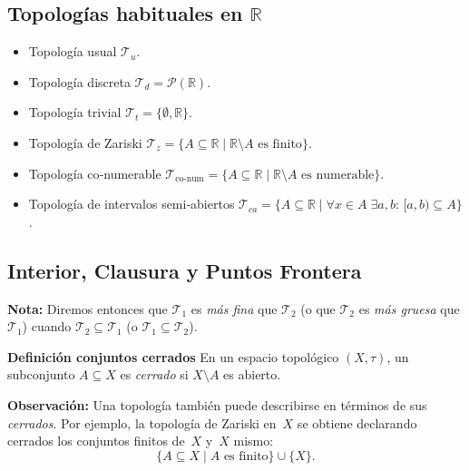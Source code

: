 \subsection{Topologías habituales en $\mathbb{R}$}
\begin{itemize}
  \item Topología usual\; $\mathcal T_{u}$.
  \item Topología discreta\;
        $\displaystyle \mathcal T_{d}=\mathcal{P}(\mathbb{R})$.
  \item Topología trivial\;
        $\displaystyle \mathcal T_{t}=\{\emptyset,\mathbb{R}\}$.
  \item Topología de Zariski\;
        $\displaystyle \mathcal T_{z}=\{A\subseteq\mathbb{R}\mid\mathbb{R}\setminus A
        \text{ es finito}\}$.
  \item Topología co‑numerable\;
        $\displaystyle \mathcal T_{\text{co‑num}}=
        \{A\subseteq\mathbb{R}\mid\mathbb{R}\setminus A
        \text{ es numerable}\}$.
  \item Topología de intervalos semi‑abiertos\;
        $\displaystyle \mathcal T_{ca}=
        \{A\subseteq\mathbb{R}\mid
          \forall x\in A\;\exists a,b:\,[a,b)\subseteq A\}$.
\end{itemize}

\subsection{Interior, Clausura y Puntos Frontera}


\textbf{Nota:} Diremos entonces que $\mathcal T_1$ es \emph{más fina} que $\mathcal T_2$ (o que $\mathcal T_2$ es \emph{más gruesa} que $\mathcal T_1$) cuando $\mathcal T_2\subseteq\mathcal T_1 $ (o $\mathcal T_1\subseteq\mathcal T_2$).

\textbf{Definición conjuntos cerrados}
En un espacio topológico $(X,\tau)$, un subconjunto
$A\subseteq X$ es \emph{cerrado} si $X\setminus A$ es abierto.

\textbf{Observación:}
Una topología también puede describirse en términos de sus \emph{cerrados}.
Por ejemplo, la topología de Zariski en~$X$ se obtiene declarando
cerrados los conjuntos finitos de~$X$ y~$X$ mismo:
\[
  \{A\subseteq X\mid A \text{ es finito}\}\cup\{X\}.
\]

